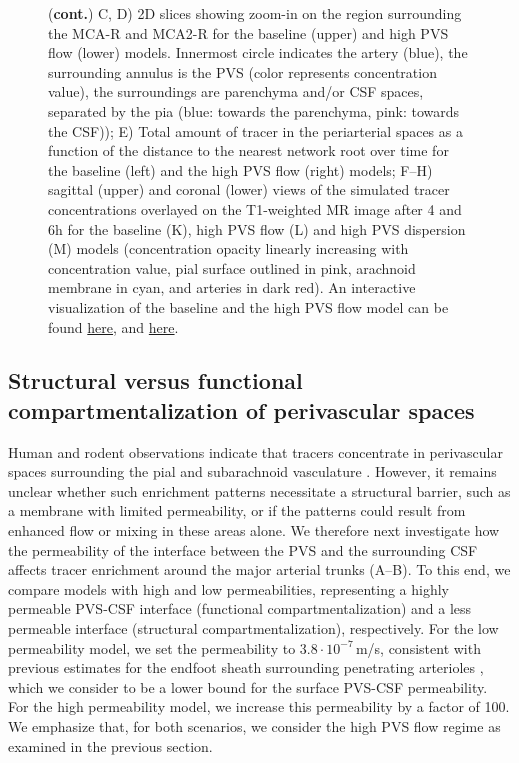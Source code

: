 \documentclass[fleqn,10pt]{wlscirep}
\begin{document}
\begin{figure}
\ContinuedFloat
\caption{(\textbf{cont.})
    C, D) 2D slices showing zoom-in on the region surrounding the MCA-R and MCA2-R for the baseline (upper) and high PVS flow (lower) models. Innermost circle indicates the artery (blue), the surrounding annulus is the PVS (color represents concentration value), the surroundings are parenchyma and/or CSF spaces, separated by the pia (blue: towards the parenchyma, pink: towards the CSF));  
    E) Total amount of tracer in the periarterial spaces as a function of the distance to the nearest network root over time for the baseline (left) and the high PVS flow (right) models;
    F--H) sagittal (upper) and coronal (lower) views of the simulated tracer concentrations overlayed on the T1-weighted MR image after 4 and 6h for the baseline (K), high PVS flow (L) and high PVS dispersion (M) models (concentration opacity linearly increasing with concentration value, pial surface outlined in pink, arachnoid membrane in cyan, and arteries in dark red). An interactive visualization of the baseline and the high PVS flow model can be found \href{https://baseline-pvs-flow.surge.sh/}{here}, and \href{https://high-pvs-flow.surge.sh/}{here}.}
\end{figure}  

\subsection*{Structural versus functional compartmentalization of perivascular spaces}

Human and rodent observations indicate that tracers concentrate in perivascular spaces surrounding the pial and subarachnoid vasculature \cite{zhang1990interrelationships,zhang1992directional, bedussi2017paravascular, mestre2018flow, bedussi2018paravascular, eide2024functional}. However, it remains unclear whether such enrichment patterns necessitate a structural barrier, such as a membrane with limited permeability, or if the patterns could result from enhanced flow or mixing in these areas alone. We therefore next investigate how the permeability of the interface between the PVS and the surrounding CSF affects tracer enrichment around the major arterial trunks (A--B). To this end, we compare models with high and low  permeabilities, representing a highly permeable PVS-CSF interface (functional compartmentalization) and a less permeable interface (structural compartmentalization), respectively. For the low permeability model, we set the permeability to $3.8 \cdot 10^{-7}\,$m/s, consistent with previous estimates for the endfoot sheath surrounding penetrating arterioles \cite{koch2023estimates}, which we consider to be a lower bound for the surface PVS-CSF permeability. For the high permeability model, we increase this permeability by a factor of 100. We emphasize that, for both scenarios, we consider the high PVS flow regime as examined in the previous section. 
\end{document}
